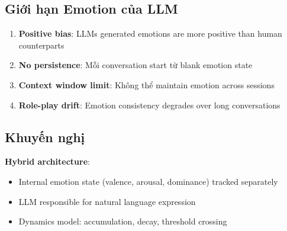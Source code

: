 \subsection{Giới hạn Emotion của LLM}

\begin{enumerate}
    \item \textbf{Positive bias}: LLMs generated emotions are more positive than human counterparts
    \item \textbf{No persistence}: Mỗi conversation start từ blank emotion state
    \item \textbf{Context window limit}: Không thể maintain emotion across sessions
    \item \textbf{Role-play drift}: Emotion consistency degrades over long conversations
\end{enumerate}

\subsection{Khuyến nghị}

\textbf{Hybrid architecture}:
\begin{itemize}
    \item Internal emotion state (valence, arousal, dominance) tracked separately
    \item LLM responsible for natural language expression
    \item Dynamics model: accumulation, decay, threshold crossing
\end{itemize}


